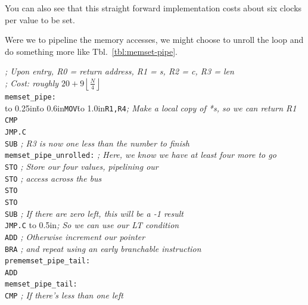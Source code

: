 \documentclass{gqtekspec}
\begin{document}
You can also see that this straight forward implementation costs about
six clocks per value to be set.

Were we to pipeline the memory accesses, we might choose to unroll the loop
and do something more like Tbl.~\ref{tbl:memset-pipe}.
\begin{table}\begin{center}
\begin{tabbing}
{\em ; Upon entry, R0 = return address, R1 = s, R2 = c, R3 = len}\\
{\em ; Cost: roughly $20+9\left\lfloor\frac{N}{4}\right\rfloor$}\\
{\tt memset\_pipe:}\\
\hbox to 0.25in{}\=\hbox to 0.6in{\tt MOV}\=\hbox to 1.0in{\tt R1,R4}\={\em ; Make a local copy of *s, so we can return R1}\\
\>	{\tt CMP}\\
\>	{\tt JMP.C}\\
\>	{\tt SUB}\> {\em ; R3 is now one less than the number to finish}\\
{\tt memset\_pipe\_unrolled:}\>\>\> {\em ; Here, we know we have at least four more to go}\\
\>	{\tt STO} \> {\em  ; Store our four values, pipelining our}\\
\>	{\tt STO} \> {\em ; access across the bus }\\
\>	{\tt STO} \\
\>	{\tt STO} \\
\>	{\tt SUB} \> {\em; If there are zero left, this will be a -1 result}\\
\>	{\tt JMP.C}\> \hbox to 0.5in{}\= {\em; So we can use our LT condition}\\
\>	{\tt ADD} \> {\em ; Otherwise increment our pointer}\\
\>	{\tt BRA} {\em ; and repeat using an early branchable instruction}\\
{\tt prememset\_pipe\_tail:} \\
\>    {\tt ADD}\\
{\tt memset\_pipe\_tail:}\>\>\\
\>	{\tt CMP}	\> {\em ; If there's less than one left}\\

\end{tabbing}
\end{center}
\end{table}
\end{document}
